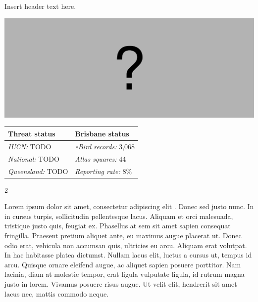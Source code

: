 \documentclass[12pt,openany,oneside]{book}
\let\origfigure\figure
\let\endorigfigure\endfigure
\renewenvironment{figure}[1][2] {
  \expandafter\origfigure\expandafter[H]
} {
  \endorigfigure
}
\let\Begin\begin
\let\End\end
\theoremstyle{definition}
\theoremstyle{definition}
\theoremstyle{definition}
\theoremstyle{remark}
\begin{document}

Insert header text here.

\begin{figure}
\centering
\includegraphics[width=\textwidth,keepaspectratio=true]{assets/misc/missing-profile.png}
\caption{Insert caption here.}
\end{figure}

\begin{tabu} to 
\toprule
Threat status & Brisbane status\\
\midrule
\textit{IUCN:} TODO & \textit{eBird records:} 3,068\\
\textit{National:} TODO & \textit{Atlas squares:} 44\\
\textit{Queensland:} TODO & \textit{Reporting rate:} 8\%\\
\bottomrule
\end{tabu} 
\vspace{0.15cm}

\Begin{multicols}{2}

Lorem ipsum dolor sit amet, consectetur adipiscing elit
\citep{rexample1, rexample2, rexample3}. Donec sed justo nunc. In in
cursus turpis, sollicitudin pellentesque lacus. Aliquam et orci
malesuada, tristique justo quis, feugiat ex. Phasellus at sem sit amet
sapien consequat fringilla. Praesent pretium aliquet ante, eu maximus
augue placerat ut. Donec odio erat, vehicula non accumsan quis,
ultricies eu arcu. Aliquam erat volutpat. In hac habitasse platea
dictumst. Nullam lacus elit, luctus a cursus ut, tempus id arcu. Quisque
ornare eleifend augue, ac aliquet sapien posuere porttitor. Nam lacinia,
diam at molestie tempor, erat ligula vulputate ligula, id rutrum magna
justo in lorem. Vivamus posuere risus augue. Ut velit elit, hendrerit
sit amet lacus nec, mattis commodo neque.

\End{multicols}

\clearpage
\end{document}
